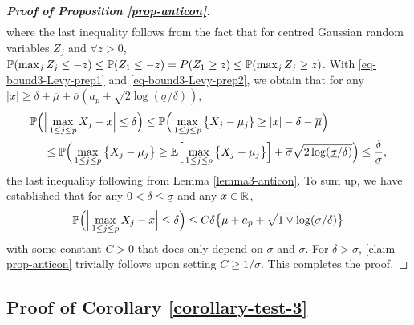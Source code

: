 \documentclass[a4paper,12pt]{article}
\numberwithin{equation}{section}
\begin{document}
\begin{proof}[\textnormal{\textbf{Proof of Proposition \ref{prop-anticon}}}]
\begin{align}
\end{align}
where the last inequality follows from the fact that for centred Gaussian random variables $Z_j$ and $\forall z > 0$, $\mathbb{P}(\max_j Z_j \le - z) \le \mathbb{P}(Z_1 \le -z) = P(Z_1 \ge z) \le \mathbb{P}(\max_j Z_j \ge z)$. With \eqref{eq-bound3-Levy-prep1} and \eqref{eq-bound3-Levy-prep2}, we obtain that for any $|x| \ge \delta + \overline{\mu} + \overline{\sigma}(a_p + \sqrt{2\log(\underline{\sigma}/\delta)})$,
\begin{align*} 
\mathbb{P} \Big( & \Big| \max_{1 \le j \le p} X_j - x \Big| \le \delta \Big) \le \mathbb{P} \Big( \max_{1 \le j \le p} \big\{ X_j - \mu_j \} \ge |x| - \delta - \overline{\mu} \Big) \\
 & \le \mathbb{P} \Big( \max_{1 \le j \le p} \big\{ X_j - \mu_j \big\} \ge \mathbb{E} \Big[ \max_{1 \le j \le p} \big\{ X_j-\mu_j \big\} \Big] + \overline{\sigma} \sqrt{2\log(\underline{\sigma}/\delta)} \Big) \le \frac{\delta}{\underline{\sigma}}, 
\end{align*}
the last inequality following from Lemma \ref{lemma3-anticon}. To sum up, we have established that for any $0 < \delta \le \underline{\sigma}$ and any $x \in \mathbb{R}$, 
\begin{equation}\label{claim-prop-anticon}
\mathbb{P} \Big( \Big| \max_{1 \le j \le p} X_j - x \Big| \le \delta \Big) \le C \delta \big\{ \overline{\mu} + a_p + \sqrt{1 \vee \log(\underline{\sigma}/\delta)} \big\} 
\end{equation}
with some constant $C > 0$ that does only depend on $\underline{\sigma}$ and $\overline{\sigma}$. For $\delta > \underline{\sigma}$, \eqref{claim-prop-anticon} trivially follows upon setting $C \ge 1/\underline{\sigma}$. This completes the proof. 
\end{proof}



\subsection*{Proof of Corollary \ref{corollary-test-3}}
\end{document}
